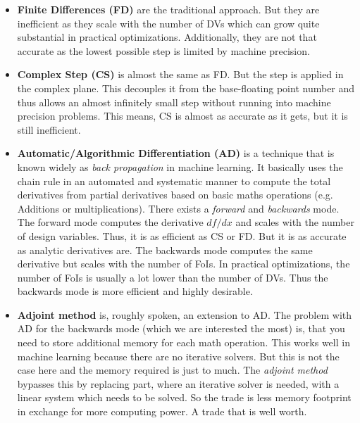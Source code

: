 \begin{itemize}
    \item \textbf{Finite Differences (FD)} are the traditional approach. But
        they are inefficient as they scale with the number of DVs which can
        grow quite substantial in practical optimizations. Additionally, they
        are not that accurate as the lowest possible step is limited by machine
        precision.

    \item \textbf{Complex Step (CS)} is almost the same as FD. But the step is
        applied in the complex plane. This decouples it from the base-floating
        point number and thus allows an almost infinitely small step without
        running into machine precision problems. This means, CS is almost as
        accurate as it gets, but it is still inefficient.

    \item \textbf{Automatic/Algorithmic Differentiation (AD)} is a technique
        that is known widely as \textit{back propagation} in machine learning.
        It basically uses the chain rule in an automated and systematic manner
        to compute the total derivatives from partial derivatives based on
        basic maths operations (e.g. Additions or multiplications). There
        exists a \textit{forward} and \textit{backwards} mode. The forward mode
        computes the derivative $d f / d x$ and scales with the number of
        design variables. Thus, it is as efficient as CS or FD. But it is as
        accurate as analytic derivatives are. The backwards mode computes the
        same derivative but scales with the number of FoIs. In practical
        optimizations, the number of FoIs is usually a lot lower than the
        number of DVs. Thus the backwards mode is more efficient and highly
        desirable.

    \item \textbf{Adjoint method} is, roughly spoken, an extension to AD. The
        problem with AD for the backwards mode (which we are interested the
        most) is, that you need to store additional memory for each math
        operation. This works well in machine learning because there are no
        iterative solvers. But this is not the case here and the memory
        required is just to much. The \textit{adjoint method} bypasses this by
        replacing part, where an iterative solver is needed,  with a linear
        system which needs to be solved. So the trade is less memory footprint
        in exchange for more computing power. A trade that is well worth.
\end{itemize}




